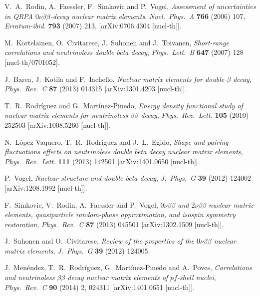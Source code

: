 \documentclass{PoS}
\begin{document}
\begin{thebibliography}{99}
   V.~A.~Rodin, A.~Faessler, F.~Simkovic and P.~Vogel,
   \emph{Assessment of uncertainties in QRPA $0\nu\beta\beta$-decay nuclear matrix elements},
   \emph{Nucl.\ Phys.\ A} {\bf 766} (2006) 107, 
   \emph{Erratum-ibid.} {\bf 793} (2007) 213,
   [arXiv:0706.4304 [nucl-th]].

   M.~Kortelainen, O.~Civitarese, J.~Suhonen and J.~Toivanen,
   \emph{Short-range correlations and neutrinoless double beta decay},
   \emph{Phys.\ Lett.\ B} {\bf 647} (2007) 128
   [nucl-th/0701052].

   J.~Barea, J.~Kotila and F.~Iachello,
   \emph{Nuclear matrix elements for double-$\beta$ decay},
   \emph{Phys.\ Rev.\ C} {\bf 87} (2013) 014315
   [arXiv:1301.4203 [nucl-th]].

   T.~R.~Rodr\'iguez and G.~Mart\'inez-Pinedo,
   \emph{Energy density functional study of nuclear matrix elements for neutrinoless $\beta\beta$ decay},
   \emph{Phys.\ Rev.\ Lett.} {\bf 105} (2010) 252503
   [arXiv:1008.5260 [nucl-th]].

   N.~L\'opez Vaquero, T.~R.~Rodr\'iguez and J.~L.~Egido,
   \emph{Shape and pairing fluctuations effects on neutrinoless double beta decay nuclear matrix elements},
   \emph{Phys.\ Rev.\ Lett.} {\bf 111} (2013) 142501
   [arXiv:1401.0650 [nucl-th]].

   P.~Vogel,
   \emph{Nuclear structure and double beta decay},
   \emph{J.\ Phys.\ G} {\bf 39} (2012) 124002
   [arXiv:1208.1992 [nucl-th]].

   F.~Simkovic, V.~Rodin, A.~Faessler and P.~Vogel,
   \emph{$0\nu\beta\beta$ and $2\nu\beta\beta$ nuclear matrix elements, quasiparticle random-phase approximation, and isospin symmetry restoration},
   \emph{Phys.\ Rev.\ C} {\bf 87} (2013) 045501
   [arXiv:1302.1509 [nucl-th]].

   J.~Suhonen and O.~Civitarese,
   \emph{Review of the properties of the $0\nu\beta\beta$ nuclear matrix elements},
   \emph{J.\ Phys.\ G} {\bf 39} (2012) 124005.

   J.~Men\'endez, T.~R.~Rodr\'iguez, G.~Mart\'inez-Pinedo and A.~Poves,
   \emph{Correlations and neutrinoless $\beta\beta$ decay nuclear matrix elements of $pf$-shell nuclei},
   \emph{Phys.\ Rev.\ C} {\bf 90} (2014) 2,  024311
   [arXiv:1401.0651 [nucl-th]].


\end{thebibliography}
\end{document}
